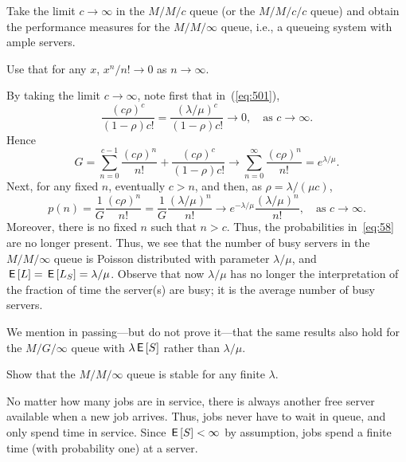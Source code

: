 \begin{exercise}
  Take the limit $c\to \infty$ in the $M/M/c$ queue (or the $M/M/c/c$ queue) and obtain the performance measures for the $M/M/\infty$ queue, i.e., a queueing system with ample servers.
  \begin{hint}
Use that for any $x$, $x^n/n!\to 0$ as $n\to\infty$.
  \end{hint}
  \begin{solution}
  By taking the limit $c\to\infty$, note first that in~(\ref{eq:501}),
\begin{equation*}
\frac{(c\rho)^c}{(1-\rho)c!} = \frac{(\lambda/\mu)^c}{(1-\rho)c!}\to 0, \quad\text{as } c\to \infty.
\end{equation*}
Hence
\begin{equation*}
G =\sum_{n=0}^{c-1} \frac{(c\rho)^n}{n!} + \frac{(c\rho)^c}{(1-\rho)c!} \to \sum_{n=0}^{\infty} \frac{(c\rho)^n}{n!} = e^{\lambda/\mu}.
\end{equation*}
Next, for any fixed $n$, eventually $c>n$, and then, as $\rho=\lambda/(\mu c)$, 
\begin{equation*}
  p(n) = \frac{1}G \frac{(c\rho)^n}{n!} = \frac{1}G \frac{(\lambda/\mu)^n}{n!} 
\to e^{-\lambda/\mu}  \frac{(\lambda/\mu)^n}{n!}, \quad\text{as } c\to\infty.
\end{equation*}
Moreover, there is no fixed $n$ such that $n>c$. Thus, the probabilities in~\eqref{eq:58} are no longer present. Thus, we see that the number of busy servers in the $M/M/\infty$ queue is
Poisson distributed with parameter $\lambda/\mu$, and
$\,\mathsf{E}\left[L\right] = \,\mathsf{E}\left[L_S\right] = \lambda/\mu$.  Observe that now $\lambda/\mu$ has
no longer the interpretation of the fraction of time the server(s) are
busy; it is the average number of busy servers.

We mention in passing---but do not
prove it---that the same results also hold for the $M/G/\infty$ queue
with $\lambda \,\mathsf{E}\left[S\right]$ rather than $\lambda/\mu$.
  \end{solution}


\end{exercise}

\begin{extra}
 Show that the $M/M/\infty$ queue is stable for any finite $\lambda$. 
 \begin{solution}
    No matter how many jobs are in service, there is always another
   free server available when a new job arrives. Thus, jobs never have
   to wait in queue, and only spend time in service. Since
   $\,\mathsf{E}\left[S\right] < \infty$ by assumption, jobs spend a finite time (with
   probability one) at a server.
\end{solution}
\end{extra}

